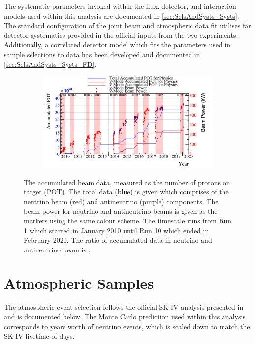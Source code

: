 The systematic parameters invoked within the flux, detector, and interaction models used within this analysis are documented in \autoref{sec:SelsAndSysts_Systs}. The standard configuration of the joint beam and atmospheric data fit utilises far detector systematics provided in the official inputs from the two experiments. Additionally, a correlated detector model which fits the parameters used in sample selections to data has been developed and documented in \autoref{sec:SelsAndSysts_Systs_FD}.

\begin{figure}[h]
  \begin{subfigure}[t]{\textwidth}
    \includegraphics[width=\textwidth, trim={0mm 0mm 0mm 0mm}, clip,page=1]{Figures/Selections/BeamPowerAndPOT.pdf}
  \end{subfigure}
  \caption{The accumulated beam data, measured as the number of protons on target (POT). The total data (blue) is given which comprises of the neutrino beam (red) and antineutrino (purple) components. The beam power for neutrino and antineutrino beams is given as the markers using the same colour scheme. The timescale runs from Run 1 which started in January 2010 until Run 10 which ended in February 2020. The ratio of accumulated data in neutrino and antineutrino beam is .}
  \label{fig:SelsAndSysts_Beam_PowerAndPOT}
\end{figure}


\newpage
\section{Atmospheric Samples}
\label{sec:SelsAndSysts_Sels_Atms}

The atmospheric event selection follows the official SK-IV analysis presented in \cite{Jiang2019-iw} and is documented below. The Monte Carlo prediction used within this analysis corresponds to  years worth of neutrino events, which is scaled down to match the SK-IV livetime of  days.

